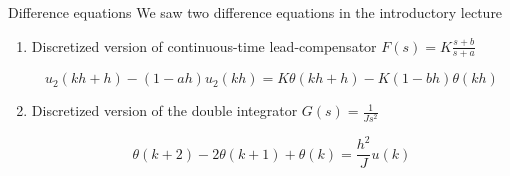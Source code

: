 \documentclass[presentation,aspectratio=1610]{beamer}
\begin{document}
\begin{frame}[label={sec:org2b78030}]{Difference equations}
We saw two difference equations in the introductory lecture

\begin{enumerate}
\item Discretized version of continuous-time lead-compensator \(F(s)=K\frac{s+b}{s+a}\)
\begin{center}
\end{center}
\[ u_2(kh+h) - (1-ah)u_2(kh) = K\theta(kh+h) - K(1-bh)\theta(kh) \]
\item Discretized version of the double integrator \(G(s)=\frac{1}{Js^2}\)
\begin{center}
\end{center}
\[ \theta(k+2) - 2\theta(k+1) + \theta(k) = \frac{h^2}{J} u(k)\]
\end{enumerate}
\end{frame}
\end{document}
